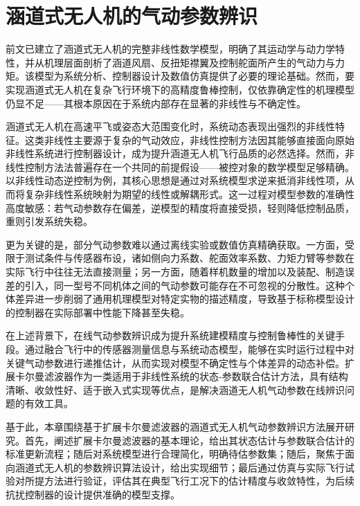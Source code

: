 
\chapter{涵道式无人机的气动参数辨识}
前文已建立了涵道式无人机的完整非线性数学模型，明确了其运动学与动力学特性，并从机理层面剖析了涵道风扇、反扭矩襟翼及控制舵面所产生的气动力与力矩。该模型为系统分析、控制器设计及数值仿真提供了必要的理论基础。然而，要实现涵道式无人机在复杂飞行环境下的高精度鲁棒控制，仅依靠确定性的机理模型仍显不足——其根本原因在于系统内部存在显著的非线性与不确定性。

涵道式无人机在高速平飞或姿态大范围变化时，系统动态表现出强烈的非线性特征。这类非线性主要源于复杂的气动效应，非线性控制方法因其能够直接面向原始非线性系统进行控制器设计，成为提升涵道无人机飞行品质的必然选择。然而，非线性控制方法法普遍存在一个共同的前提假设——被控对象的数学模型足够精确。以非线性动态逆控制为例，其核心思想是通过对系统模型求逆来抵消非线性项，从而将复杂非线性系统映射为期望的线性或解耦形式。这一过程对模型参数的准确性高度敏感：若气动参数存在偏差，逆模型的精度将直接受损，轻则降低控制品质，重则引发系统失稳。

更为关键的是，部分气动参数难以通过离线实验或数值仿真精确获取。一方面，受限于测试条件与传感器布设，诸如侧向力系数、舵面效率系数、力矩力臂等参数在实际飞行中往往无法直接测量；另一方面，随着样机数量的增加以及装配、制造误差的引入，同一型号不同机体之间的气动参数可能存在不可忽视的分散性。这种个体差异进一步削弱了通用机理模型对特定实物的描述精度，导致基于标称模型设计的控制器在实际部署中性能下降甚至失稳。

在上述背景下，在线气动参数辨识成为提升系统建模精度与控制鲁棒性的关键手段。通过融合飞行中的传感器测量信息与系统动态模型，能够在实时运行过程中对关键气动参数进行递推估计，从而实现对模型不确定性与个体差异的动态补偿。扩展卡尔曼滤波器作为一类适用于非线性系统的状态-参数联合估计方法，具有结构清晰、收敛性好、适于嵌入式实现等优点，是解决涵道无人机气动参数在线辨识问题的有效工具。

基于此，本章围绕基于扩展卡尔曼滤波器的涵道式无人机气动参数辨识方法展开研究。首先，阐述扩展卡尔曼滤波器的基本理论，给出其状态估计与参数联合估计的标准更新流程；随后对系统模型进行合理简化，明确待估参数集；随后，聚焦于面向涵道式无人机的参数辨识算法设计，给出实现细节；最后通过仿真与实际飞行试验对所提方法进行验证，评估其在典型飞行工况下的估计精度与收敛特性，为后续抗扰控制器的设计提供准确的模型支撑。


